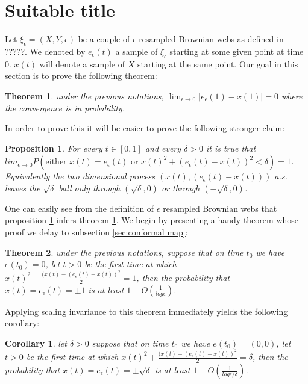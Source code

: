 \documentclass[11pt]{article}
\newtheorem{theorem}{Theorem}[section]
\newtheorem{propos}{Proposition}
\newtheorem{cor}{Corollary}
\begin{document}
{
\section{Suitable title}
Let $\xi_\epsilon=(X,Y,\epsilon)$ be a couple of $\epsilon$ resampled Brownian webs as defined in ?????. We denoted by $e_\epsilon(t)$ a sample of $\xi_\epsilon$ starting at some given point at time $0$. $x(t)$ will denote a sample of $X$ starting at the same point. Our goal in this section is to prove the following theorem:

\begin{theorem}\label{thm:main1}
under the previous notations, $\lim_{\epsilon \rightarrow 0} |e_\epsilon(1)- x(1)| = 0$ where the convergence is in probability.
\end{theorem}

In order to prove this it will be easier to prove the following stronger claim:
\begin{propos}\label{prop:main2}
For every $t\in[0,1]$ and every $\delta>0$ it is true that $lim_{\epsilon \rightarrow 0}P\left(\text{either } x(t)=e_\epsilon(t) \text{ or } x(t)^2+(e_\epsilon(t)-x(t))^2<\delta\right)=1$. Equivalently the two dimensional process 
$(x(t),(e_\epsilon(t)-x(t)))$ a.s. leaves the $\sqrt\delta$ ball only through $(\sqrt\delta,0)$ or through $(-\sqrt\delta,0)$.
\end{propos}

One can easily see from the definition of $\epsilon$ resampled Brownian webs that proposition \ref{prop:main2} infers theorem \ref{thm:main1}.
We begin by presenting a handy theorem whose proof we delay to subsection \ref{sec:conformal map}:

\begin{theorem}\label{thm:no-escape}
under the previous notations, suppose that on time $t_0$ we have $e(t_0)=0$, let $t>0$ be the first time at which $x(t)^2+\frac{(x(t)-(e_\epsilon(t)-x(t))^2}2=1$, then the probability that $x(t)=e_\epsilon(t)=\pm1$ is at least $1-O(\frac1{log\epsilon})$.
\end{theorem}

Applying scaling invariance to this theorem immediately yields the following corollary:
\begin{cor}\label{cor:cor0}
let $\delta>0$ suppose that on time $t_0$ we have $e(t_0)=(0,0)$, let $t>0$ be the first time at which $x(t)^2+\frac{(x(t)-(e_\epsilon(t)-x(t))^2}2=\delta$, then the probability that $x(t)=e_\epsilon(t)=\pm\sqrt\delta$ is at least $1-O(\frac{1}{log\epsilon/\delta})$.
\end{cor}

}
\end{document}

